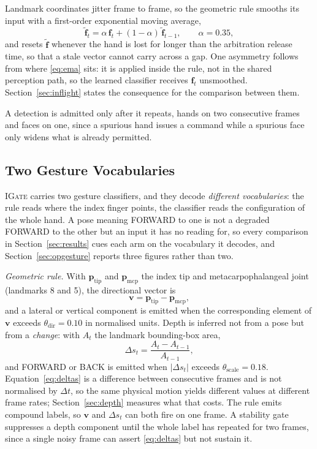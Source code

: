 \documentclass[conference]{IEEEtran}
\newcommand{\method}[1]{\textsc{#1}}
\begin{document}
Landmark coordinates jitter frame to frame, so the geometric rule smooths its
input with a first-order exponential moving average,
\begin{equation}
\tilde{\mathbf{f}}_t=\alpha\,\mathbf{f}_t+(1-\alpha)\,\tilde{\mathbf{f}}_{t-1},
\qquad \alpha=0.35 ,
\label{eq:ema}
\end{equation}
and resets $\tilde{\mathbf{f}}$ whenever the hand is lost for longer than the
arbitration release time, so that a stale vector cannot carry across a gap. One
asymmetry follows from where \eqref{eq:ema} sits: it is applied inside the rule,
not in the shared perception path, so the learned classifier receives
$\mathbf{f}_t$ unsmoothed. Section~\ref{sec:inflight} states the consequence for
the comparison between them.

A detection is admitted only after it repeats, hands on two consecutive frames
and faces on one, since a spurious hand issues a command while a spurious face
only widens what is already permitted.

\subsection{Two Gesture Vocabularies}
\label{sec:vocab}

\method{IGate} carries two gesture classifiers, and they decode
\emph{different vocabularies}: the rule reads where the index finger points, the
classifier reads the configuration of the whole hand. A pose meaning FORWARD to
one is not a degraded FORWARD to the other but an input it has no reading for,
so every comparison in Section~\ref{sec:results} cues each arm on the vocabulary
it decodes, and Section~\ref{sec:opgesture} reports three figures rather than
two.

\textit{Geometric rule.} With $\mathbf{p}_{\mathrm{tip}}$ and
$\mathbf{p}_{\mathrm{mcp}}$ the index tip and metacarpophalangeal joint
(landmarks 8 and 5), the directional vector is
\begin{equation}
\mathbf{v}=\mathbf{p}_{\mathrm{tip}}-\mathbf{p}_{\mathrm{mcp}},
\label{eq:vindex}
\end{equation}
and a lateral or vertical component is emitted when the corresponding element of
$\mathbf{v}$ exceeds $\theta_{\mathrm{dir}}=0.10$ in normalised units. Depth is
inferred not from a pose but from a \emph{change}: with $A_t$ the landmark
bounding-box area,
\begin{equation}
\Delta s_t=\frac{A_t-A_{t-1}}{A_{t-1}},
\label{eq:deltas}
\end{equation}
and FORWARD or BACK is emitted when $|\Delta s_t|$ exceeds
$\theta_{\mathrm{scale}}=0.18$. Equation~\eqref{eq:deltas} is a difference
between consecutive frames and is not normalised by $\Delta t$, so the same
physical motion yields different values at different frame rates;
Section~\ref{sec:depth} measures what that costs. The rule emits compound
labels, so $\mathbf{v}$ and $\Delta s_t$ can both fire on one frame. A stability
gate suppresses a depth component until the whole label has repeated for two
frames, since a single noisy frame can assert \eqref{eq:deltas} but not sustain
it.
\end{document}
